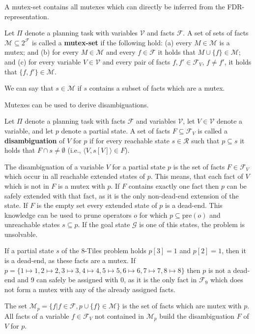 A mutex-set contains all mutexes which can directly be inferred from the FDR-representation.
\begin{definition}
    Let $\Pi$ denote a planning task with variables $\mathcal{V}$ and facts $\mathcal{F}$.
    A set of sets of facts $\mathcal{M}\subseteq 2^{\mathcal{F}}$ is called a \textbf{mutex-set} if the following hold:
    (a) every $M\in\mathcal{M}$ is a mutex;
    and (b) for every $M\in\mathcal{M}$ and every $f\in\mathcal{F}$ it holds that $M\cup\{f\}\in\mathcal{M}$;
    and (c) for every variable $V\in\mathcal{V}$ and every pair of facts $f, f'\in\mathcal{F}_V$, $f\neq f'$, it holds
    that $\{f,f'\}\in\mathcal{M}$.
\end{definition}

We can say that $s\in\mathcal{M}$ if $s$ contains a subset of facts which are a mutex.

Mutexes can be used to derive disambiguations.
\begin{definition}
    Let $\Pi$ denote a planning task with facts $\mathcal{F}$ and variables $\mathcal{V}$, let $V\in\mathcal{V}$ denote
    a variable, and let $p$ denote a partial state.
    A set of facts $F\subseteq\mathcal{F}_V$ is called a \textbf{disambiguation} of $V$ for $p$ if for every reachable state
    $s\in\mathcal{R}$ such that $p\subseteq s$ it holds that $F\cap s\neq\emptyset$ (i.e., $\langle V,s[V]\rangle\in F$).
\end{definition}

The disambiguation of a variable $V$ for a partial state $p$ is the set of facts $F\in\mathcal{F}_V$ which occur in all reachable extended states of $p$.
This means, that each fact of $V$ which is not in $F$ is a mutex with $p$.
If $F$ contains exactly one fact then $p$ can be safely extended with that fact, as it is the only non-dead-end extension of the state.
If $F$ is the empty set every extended state of $p$ is a dead-end.
This knowledge can be used to prune operators $o$ for which $p\subseteq\text{pre}(o)$ and unreachable states $s\subseteq p$.
If the goal state $\mathcal{G}$ is one of this states, the problem is unsolvable.

If a partial state $s$ of the 8-Tiles problem holds $p[3] = 1$ and $p[2] = 1$, then it is a dead-end, as these facts are a mutex.
If $p = \{1\mapsto1, 2\mapsto2, 3\mapsto3, 4\mapsto4, 5\mapsto5, 6\mapsto6, 7\mapsto7, 8\mapsto8\}$ then $p$ is not a dead-end and 9 can safely be assigned with $0$, as it is the only fact in $\mathcal{F}_9$ which does not form a mutex with any of the already assigned facts.

The set $\mathcal{M}_p=\{f|f\in\mathcal{F}, p\cup\{f\}\in\mathcal{M}\}$ is the set of facts which are mutex with $p$.
All facts of a variable $f\in\mathcal{F}_V$ not contained in $\mathcal{M}_p$ build the disambiguation $F$ of $V$ for $p$.


